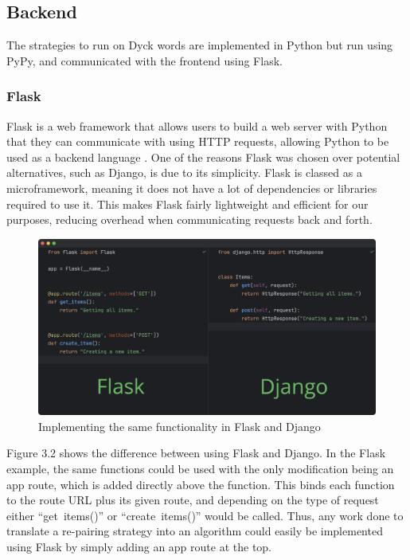 \subsection{Backend}
The strategies to run on Dyck words are implemented in Python but run using PyPy, and communicated with the frontend using Flask.

\subsubsection{Flask}
Flask is a web framework that allows users to build a web server with Python that they can communicate with using HTTP requests, allowing Python to be used as a backend language \cite{whatisFlask}. One of the reasons Flask was chosen over potential alternatives, such as Django, is due to its simplicity. Flask is classed as a microframework, meaning it does not have a lot of dependencies or libraries required to use it. This makes Flask fairly lightweight and efficient for our purposes, reducing overhead when communicating requests back and forth. 

\begin{figure}[H]
    \centering
    \includegraphics[scale=0.3]{./images/flaskVSdjango.png}
    \caption{Implementing the same functionality in Flask and Django \cite{flaskVSdjango}}
\end{figure}

\noindent Figure 3.2 shows the difference between using Flask and Django. In the Flask example, the same functions could be used with the only modification being an app route, which is added directly above the function. This binds each function to the route URL plus its given route, and depending on the type of request either ``get\textunderscore~items()'' or ``create\textunderscore~items()'' would be called. Thus, any work done to translate a re-pairing strategy into an algorithm could easily be implemented using Flask by simply adding an app route at the top.

